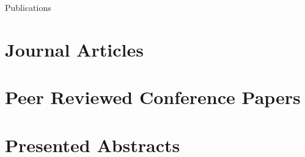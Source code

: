 \documentclass[
	11pt, %
]{resume} %
\begin{document}
\pagebreak
\begin{rSection}{Publications}

\section*{Journal Articles}
    
    \nocite{*} %
    
    \printbibliography[
    heading=none,
    type=article
    ]

\section*{Peer Reviewed Conference Papers}
    
    \nocite{*} %
    
    \printbibliography[
    heading=none,
    type=inproceedings
    ]

\section*{Presented Abstracts}
    
    \nocite{*} %
    
    \printbibliography[
    heading=none,
    type=misc
    ]
	

\end{rSection}





\end{document}
